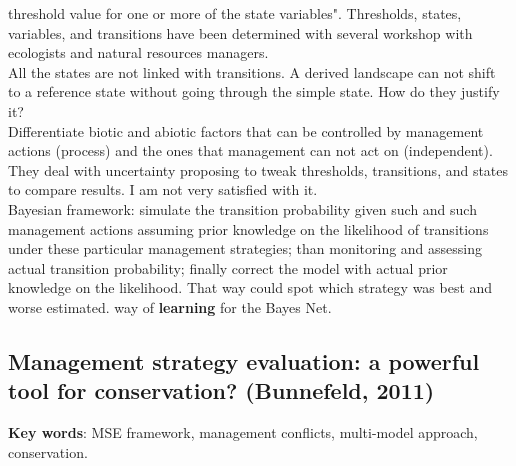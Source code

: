 \documentclass[12pt]{article}
\begin{document}
threshold value for one or more of the state
variables". Thresholds, states, variables, and transitions have been determined with several workshop with ecologists and natural resources managers.\\
All the states are not linked with transitions. A derived landscape can not shift to a reference state without going through the simple state. How do they justify it?\\
Differentiate biotic and abiotic factors that can be controlled by management actions (process) and the ones that management can not act on (independent).\\
They deal with uncertainty proposing to tweak thresholds, transitions, and states to compare results. I am not very satisfied with it.\\
Bayesian framework: simulate the transition probability given such and such management actions assuming prior knowledge on the likelihood of transitions under these particular management strategies; than monitoring and assessing actual transition probability; finally correct the model with actual prior knowledge on the likelihood. That way could spot which strategy was best and worse estimated.  way of \textbf{learning} for the Bayes Net.

\subsection{Management strategy evaluation: a powerful tool for conservation? (Bunnefeld, 2011)}
\textbf{Key words}: MSE framework, management conflicts, multi-model approach, conservation.\\
\end{document}
